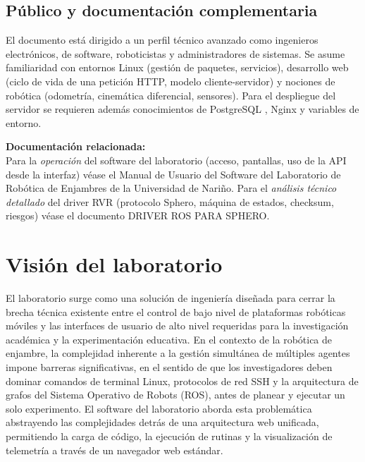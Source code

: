 \documentclass[12pt]{article}
\numberwithin{figure}{section}
\numberwithin{table}{section}
\begin{document}
\subsection{Público y documentación complementaria}

El documento está dirigido a un perfil técnico avanzado como ingenieros electrónicos, de software, roboticistas y administradores de sistemas. Se asume familiaridad con entornos Linux (gestión de paquetes, servicios), desarrollo web (ciclo de vida de una petición HTTP, modelo cliente-servidor) y nociones de robótica (odometría, cinemática diferencial, sensores). Para el despliegue del servidor se requieren además conocimientos de PostgreSQL \cite{PostgreSQL_Website}, Nginx \cite{Nginx_Website}  y variables de entorno.

\begin{tipbox}
\textbf{Documentación relacionada:}\\
Para la \emph{operación} del software del laboratorio (acceso, pantallas, uso de la API desde la interfaz) véase el Manual de Usuario del Software del Laboratorio de Robótica de Enjambres de la Universidad de Nariño. Para el \emph{análisis técnico detallado} del driver RVR (protocolo Sphero, máquina de estados, checksum, riesgos) véase el documento DRIVER ROS PARA SPHERO.
\end{tipbox}


\section{Visión del laboratorio}
\justifying

El laboratorio surge como una solución de ingeniería diseñada para cerrar la brecha técnica existente entre el control de bajo nivel de plataformas robóticas móviles y las interfaces de usuario de alto nivel requeridas para la investigación académica y la experimentación educativa. En el contexto de la robótica de enjambre, la complejidad inherente a la gestión simultánea de múltiples agentes impone barreras significativas, en el sentido de que los investigadores deben dominar comandos de terminal Linux, protocolos de red SSH y la arquitectura de grafos del Sistema Operativo de Robots (ROS), antes de planear y ejecutar un solo experimento. El software del laboratorio aborda esta problemática abstrayendo las complejidades detrás de una arquitectura web unificada, permitiendo la carga de código, la ejecución de rutinas y la visualización de telemetría a través de un navegador web estándar.
\end{document}

